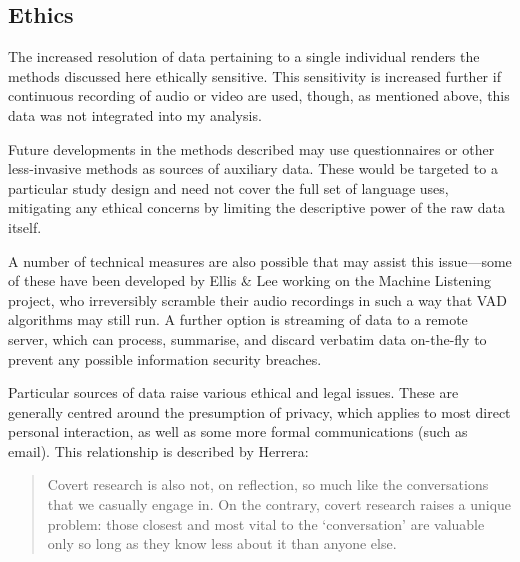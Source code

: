 \subsection{Ethics}
\label{sec:personal:discussion:ethics}


The increased resolution of data pertaining to a single individual renders the methods discussed here ethically sensitive.  This sensitivity is increased further if continuous recording of audio or video are used, though, as mentioned above, this data was not integrated into my analysis.


Future developments in the methods described may use questionnaires or other less-invasive methods as sources of auxiliary data.  These would be targeted to a particular study design and need not cover the full set of language uses, mitigating any ethical concerns by limiting the descriptive power of the raw data itself.

A number of technical measures are also possible that may assist this issue---some of these have been developed by Ellis \& Lee working on the Machine Listening project\cite{ellis2004audiolog}, who irreversibly scramble their audio recordings in such a way that VAD algorithms may still run.  A further option is streaming of data to a remote server, which can process, summarise, and discard verbatim data on-the-fly to prevent any possible information security breaches.


Particular sources of data raise various ethical and legal issues. These are generally centred around the presumption of privacy, which applies to most direct personal interaction, as well as some more formal communications (such as email)\cite{rampton1994baal}.  This relationship is described by Herrera\cite{herrera1999covert}:

\begin{quote}
Covert research is also not, on reflection, so much like the conversations that we casually engage in. On the contrary, covert research raises a unique problem: those closest and most vital to the ‘conversation’ are valuable only so long as they know less about it than anyone else.
\end{quote}

